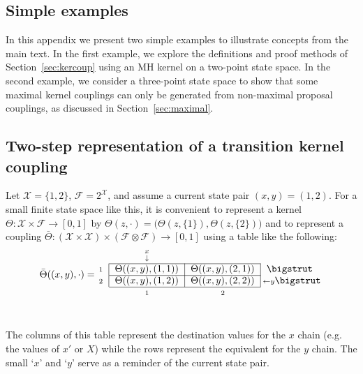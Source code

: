 \documentclass[aihp]{imsart}
\theoremstyle{plain}
\theoremstyle{remark}
\theoremstyle{definition} \newtheorem{example}{Example}
\newcommand{\eq}[1]{\begin{align*}#1\end{align*}} %
\newcommand{\scrF}{\mathscr{F}}
\newcommand{\calX}{\mathcal{X}}
\newcommand{\cd}{\cdot}
\newcommand{\calXp}{\calX \times \calX}
\newcommand{\scrFp}{\scrF \otimes \scrF}
\newcommand{\xy}{(x,y)}
\begin{document}
\begin{appendix}

\section{Simple examples}
\label{sec:example}

In this appendix we present two simple examples to illustrate concepts from the main text. In the
first example, we explore the definitions and proof methods of Section~\ref{sec:kercoup} using an MH
kernel on a two-point state space. In the second example, we consider a three-point state space to
show that some maximal kernel couplings can only be generated from non-maximal proposal couplings,
as discussed in Section~\ref{sec:maximal}.

\subsection{Two-step representation of a transition kernel coupling}
\label{ex:running}

Let $\calX = \{1,2\}$, $\scrF =
2^\calX$, and assume a current state pair $\xy = (1,2)$. For a small finite state space like this, it is
convenient to represent a kernel $\Theta : \calX \times \scrF \to [0,1]$ by
$\Theta(z, \cd) = \big( \Theta(z,\{1\}), \Theta(z,\{2\}) \big)$
and to represent a coupling ${\bar \Theta: (\calXp) \times (\scrFp) \to [0,1]}$
using a table like the following:
\eq{
	\raisebox{3.5pt}{ $ \bar \Theta(\xy, \cd)  = $ } \hspace{-5pt}
	\begin{blockarray}{rccl}
		& {\stackrel{x}{\scriptstyle \downarrow}} & &  \\
		\begin{block}{ r |c|c| l }
			\cline{2-3}
			{\scriptstyle 1}  & \Theta(\xy, (1,1) ) & \Theta(\xy, (2,1)) & \bigstrut \\
			\cline{2-3}
			{\scriptstyle 2} & \Theta(\xy, (1,2) ) & \Theta(\xy, (2,2)) & {\hspace{-4pt} \scriptstyle \leftarrow y} \bigstrut \\
			\cline{2-3}
		\end{block}
		\  & {\scriptstyle 1} & {\scriptstyle 2}
	\end{blockarray}
}\\[-1.75em]
The columns of this table represent the destination values for the $x$ chain (e.g. the values of $x'$ or $X$)
while the rows represent the equivalent for the $y$ chain. The small `$x$' and `$y$' serve
as a reminder of the current state pair.


\end{appendix}
\end{document}
